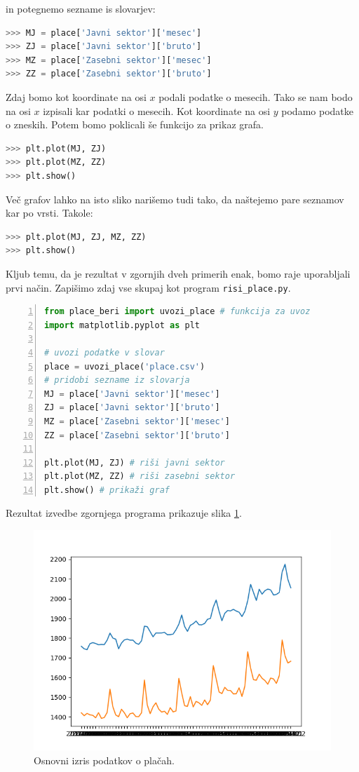 in potegnemo sezname is slovarjev:
\begin{lstlisting}[language=Python]
>>> MJ = place['Javni sektor']['mesec']
>>> ZJ = place['Javni sektor']['bruto']
>>> MZ = place['Zasebni sektor']['mesec']
>>> ZZ = place['Zasebni sektor']['bruto']
\end{lstlisting}
Zdaj bomo kot koordinate na osi $x$ podali podatke o mesecih. Tako se nam bodo na osi $x$ izpisali kar podatki o mesecih. Kot koordinate na osi $y$ podamo podatke o zneskih. Potem bomo poklicali še funkcijo za prikaz grafa.
\begin{lstlisting}[language=Python, showstringspaces=false]
>>> plt.plot(MJ, ZJ)
>>> plt.plot(MZ, ZZ)
>>> plt.show()
\end{lstlisting}
Več grafov lahko na isto sliko narišemo tudi tako, da naštejemo pare seznamov kar po vrsti. Takole: 
\begin{lstlisting}[language=Python, showstringspaces=false]
>>> plt.plot(MJ, ZJ, MZ, ZZ)
>>> plt.show()
\end{lstlisting}
Kljub temu, da je rezultat v zgornjih dveh primerih enak, bomo raje uporabljali prvi način.
Zapišimo zdaj vse skupaj kot program \texttt{risi\_place.py}.
\begin{lstlisting}[language=Python,numbers=left]
from place_beri import uvozi_place # funkcija za uvoz
import matplotlib.pyplot as plt 

# uvozi podatke v slovar
place = uvozi_place('place.csv')
# pridobi sezname iz slovarja
MJ = place['Javni sektor']['mesec']
ZJ = place['Javni sektor']['bruto']
MZ = place['Zasebni sektor']['mesec']
ZZ = place['Zasebni sektor']['bruto']

plt.plot(MJ, ZJ) # riši javni sektor
plt.plot(MZ, ZZ) # riši zasebni sektor
plt.show() # prikaži graf
\end{lstlisting}
Rezultat izvedbe zgornjega programa prikazuje slika \ref{img:plt3}.
\begin{figure}
    \includegraphics[width=\linewidth]{img/plt3.png}
    \caption{Osnovni izris podatkov o plačah.}
    \label{img:plt3}
\end{figure}

